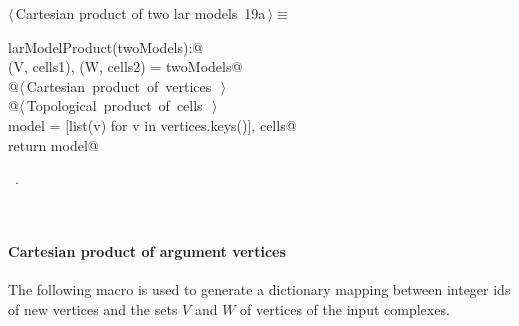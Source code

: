 \documentclass[11pt,oneside]{article}	%
\begin{document}
\begin{flushleft} \small
\begin{minipage}{\linewidth} \label{scrap28}
\protect{}$\langle\,$Cartesian product of two lar models\nobreak\ {\footnotesize 19a}$\,\rangle\equiv$
\vspace{-1ex}
\begin{list}{}{} \item
\mbox{}\verb@def larModelProduct(twoModels):@\\
\mbox{}\verb@    (V, cells1), (W, cells2) = twoModels@\\
\mbox{}\verb@    @\hbox{$\langle\,$Cartesian product of vertices\nobreak\ {\footnotesize {}}$\,\rangle$}\verb@@\\
\mbox{}\verb@    @\hbox{$\langle\,$Topological product of cells\nobreak\ {\footnotesize {}}$\,\rangle$}\verb@@\\
\mbox{}\verb@    model = [list(v) for v in vertices.keys()], cells@\\
\mbox{}\verb@    return model@\\
\mbox{}\verb@@{\NWsep}
\end{list}
\vspace{-1ex}
\footnotesize\addtolength{\baselineskip}{-1ex}
\begin{list}{}{\setlength{\itemsep}{-\parsep}\setlength{\itemindent}{-\leftmargin}}
\item \NWtxtMacroRefIn\ .
\end{list}
\end{minipage}\\[4ex]
\end{flushleft}

\paragraph{Cartesian product of argument vertices}
The following macro is used to generate a dictionary mapping between integer ids of new vertices and the sets $V$ and $W$ of vertices of the input complexes.
\end{document}
